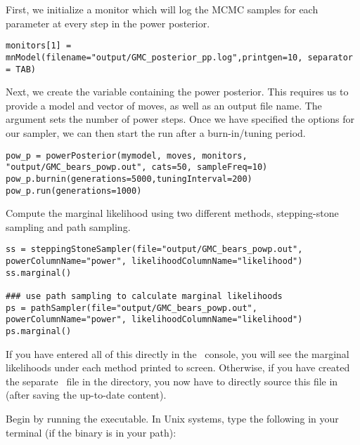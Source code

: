 First, we initialize a monitor which will log the MCMC samples for each parameter at every step in the power posterior.
{\tt \begin{snugshade*}
\begin{lstlisting}
monitors[1] = mnModel(filename="output/GMC_posterior_pp.log",printgen=10, separator = TAB)
\end{lstlisting}
\end{snugshade*}}

Next, we create the variable containing the power posterior. This requires us to provide a model and vector of moves, as well as an output file name. The  argument sets the number of power steps.
Once we have specified the options for our sampler, we can then start the run after a burn-in/tuning period.

{\tt \begin{snugshade*}
\begin{lstlisting}
pow_p = powerPosterior(mymodel, moves, monitors, "output/GMC_bears_powp.out", cats=50, sampleFreq=10) 
pow_p.burnin(generations=5000,tuningInterval=200)
pow_p.run(generations=1000)  
\end{lstlisting}
\end{snugshade*}}

Compute the marginal likelihood using two different methods, stepping-stone sampling and path sampling. 
{\tt \begin{snugshade*}
\begin{lstlisting}
ss = steppingStoneSampler(file="output/GMC_bears_powp.out", powerColumnName="power", likelihoodColumnName="likelihood")
ss.marginal() 

### use path sampling to calculate marginal likelihoods
ps = pathSampler(file="output/GMC_bears_powp.out", powerColumnName="power", likelihoodColumnName="likelihood")
ps.marginal() 
\end{lstlisting}
\end{snugshade*}}

If you have entered all of this directly in the \RevBayes~console, you will see the marginal likelihoods under each method printed to screen. 
Otherwise, if you have created the separate \Rev~file 
{\textcolor{red}{}} in the  directory, you now have to directly source this file in \RevBayes (after saving the up-to-date content). 

{\begin{framed}
Begin by running the \RevBayes executable. In Unix systems, type the following in your terminal (if the \RevBayes binary is in your path):

\colorbox{black}{\strut\hspace{1mm}\textcolor[rgb]{0,1,1}{}\hspace{0.925\textwidth}}
\end{framed}}

